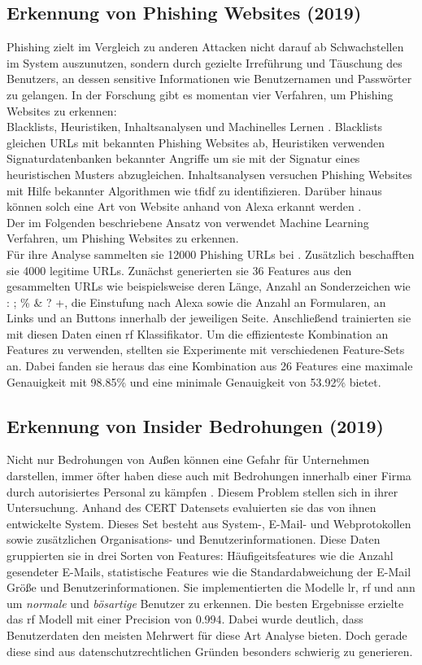 \documentclass[
    12pt, %
    DIV10,
    ngerman, %
    a4paper, %
    oneside, %
    titlepage, %
    parskip=half, %
    headings=normal, %
    listof=totoc, %
    bibliography=totoc, %
    index=totoc, %
    captions=tableheading, %
    final %
]{scrreprt}
\begin{document}
\subsection{Erkennung von Phishing Websites (2019)}
Phishing zielt im Vergleich zu anderen Attacken nicht darauf ab Schwachstellen im System auszunutzen, sondern durch gezielte Irreführung und Täuschung des Benutzers, an dessen sensitive Informationen wie Benutzernamen und Passwörter zu gelangen.
In der Forschung gibt es momentan vier Verfahren, um Phishing Websites zu erkennen:\\
Blacklists, Heuristiken, Inhaltsanalysen und Machinelles Lernen \parencite{Alswailem2019}. Blacklists gleichen URLs mit bekannten Phishing Websites ab, Heuristiken verwenden Signaturdatenbanken bekannter Angriffe um sie mit der Signatur eines heuristischen Musters abzugleichen. Inhaltsanalysen versuchen Phishing Websites mit Hilfe bekannter Algorithmen wie \ac{tfidf} zu identifizieren. Darüber hinaus können solch eine Art von Website anhand von Alexa erkannt werden \parencite{nguyen2013detecting}. \\
Der im Folgenden beschriebene Ansatz von \textcite{Alswailem2019} verwendet Machine Learning Verfahren, um Phishing Websites zu erkennen.\\
Für ihre Analyse sammelten sie 12000 Phishing URLs bei \textcite{PhishTank}. Zusätzlich beschafften sie 4000 legitime URLs. Zunächst generierten sie 36 Features aus den gesammelten URLs wie beispielsweise deren Länge, Anzahl an Sonderzeichen wie : ; \% \& ? +, die Einstufung nach Alexa sowie die Anzahl an Formularen, an Links und an Buttons innerhalb der jeweiligen Seite. Anschließend trainierten sie mit diesen Daten einen \ac{rf} Klassifikator. Um die effizienteste Kombination an Features zu verwenden, stellten sie Experimente mit verschiedenen Feature-Sets an. Dabei fanden sie heraus das eine Kombination aus 26 Features eine maximale Genauigkeit mit 98.85\% und eine minimale Genauigkeit von 53.92\% bietet. 
%
\subsection{Erkennung von Insider Bedrohungen (2019)}\label{cert}
Nicht nur Bedrohungen von Außen können eine Gefahr für Unternehmen darstellen, immer öfter haben diese auch mit Bedrohungen innerhalb einer Firma durch autorisiertes Personal zu kämpfen \parencite{Partners}. Diesem Problem stellen sich \textcite{Le2019} in ihrer Untersuchung. Anhand des CERT Datensets \parencite{glasser2013bridging} evaluierten sie das von ihnen entwickelte System. Dieses Set besteht aus System-, E-Mail- und Webprotokollen sowie zusätzlichen Organisations- und Benutzerinformationen. Diese Daten gruppierten sie in drei Sorten von Features: Häufigeitsfeatures wie die Anzahl gesendeter E-Mails, statistische Features wie die Standardabweichung der E-Mail Größe und Benutzerinformationen. Sie implementierten die Modelle \ac{lr}, \ac{rf} und \ac{ann} um \emph{normale} und \emph{bösartige} Benutzer zu erkennen. Die besten Ergebnisse erzielte das \ac{rf} Modell mit einer Precision von 0.994. Dabei wurde deutlich, dass Benutzerdaten den meisten Mehrwert für diese Art Analyse bieten. Doch gerade diese sind aus datenschutzrechtlichen Gründen besonders schwierig zu generieren. 
\end{document}
